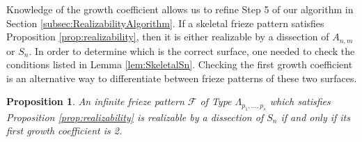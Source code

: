 \documentclass[12pt]{article}
\newtheorem{proposition}{Proposition}
\theoremstyle{remark}
\begin{document}
Knowledge of the growth coefficient allows us to refine Step 5 of our algorithm in Section \ref{subsec:RealizabilityAlgorithm}. If a skeletal frieze pattern satisfies Proposition \ref{prop:realizability}, then it is either realizable by a dissection of $A_{n,m}$ or $S_n$. In order to determine which is the correct surface, one needed to check the conditions listed in Lemma \ref{lem:SkeletalSn}. Checking the first growth coefficient is an alternative way to differentiate between frieze patterns of these two surfaces.

\begin{proposition}\label{prop:GrCo2}
An infinite frieze pattern $\mathcal{F}$ of Type $\Lambda_{p_1,\ldots,p_s}$ which satisfies Proposition \ref{prop:realizability} is realizable by a dissection of $S_n$ if and only if its first growth coefficient is 2.
\end{proposition}
\end{document}
